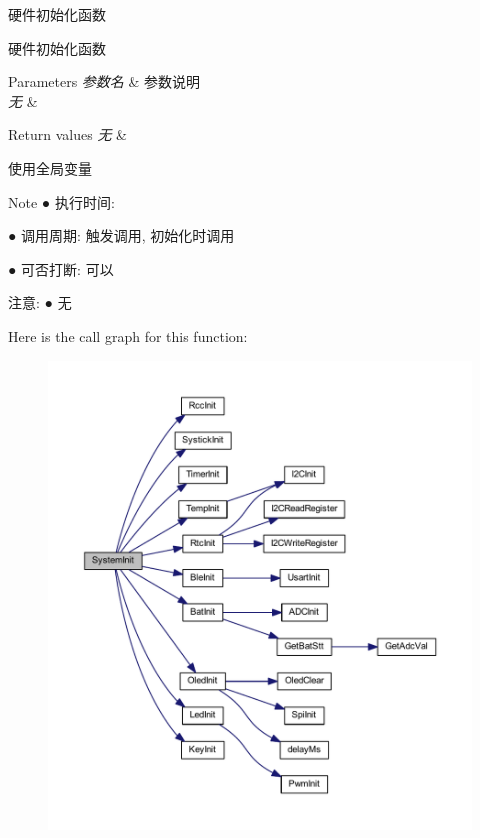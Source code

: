 硬件初始化函数 

硬件初始化函数


\begin{DoxyParams}{\-Parameters}
{\em 参数名} & 参数说明 \\
\hline
{\em 无} & \\
\hline
\end{DoxyParams}

\begin{DoxyRetVals}{\-Return values}
{\em 无} & \\
\hline
\end{DoxyRetVals}
\begin{DoxyParagraph}{使用全局变量 }

\end{DoxyParagraph}
\begin{DoxyNote}{\-Note}
● 执行时间\-: \par
 ● 调用周期\-: 触发调用, 初始化时调用 \par
 ● 可否打断\-: 可以 \par

\end{DoxyNote}
\begin{DoxyParagraph}{注意\-:}
● 无 \par
 
\end{DoxyParagraph}


\-Here is the call graph for this function\-:\nopagebreak
\begin{figure}[H]
\begin{center}
\leavevmode
\includegraphics[width=350pt]{group___m_a_n_a_g_e_ga93f514700ccf00d08dbdcff7f1224eb2_cgraph}
\end{center}
\end{figure}




